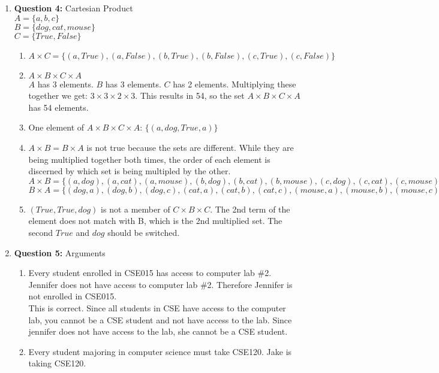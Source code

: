 \documentclass[11pt]{article}
\begin{document}
\begin{enumerate}
\begin{enumerate}[label=(\alph*)]
\end{enumerate}
\item 
\textbf{Question 4:} Cartesian Product \\
$A = \{a,b,c\}$ \\
$B = \{dog,cat,mouse\} $ \\
$C = \{True, False\} $ 
\begin{enumerate}[label=(\alph*)]
    \item
    $A \times  C = \{(a, True), (a, False), (b, True), (b, False), (c, True), (c, False)\}$
    \item 
    $A \times B \times C \times A$ \\
    $A$ has 3 elements. $B$ has 3 elements. $C$ has 2 elements. Multiplying these together we get: $3 \times 3 \times 2 \times 3$. This results in 54, so the set $A \times B \times C \times A$ has 54 elements. 
    \item
    One element of $A \times B \times C \times A$: $\{(a,dog,True,a)\}$
    \item
    $A \times B = B \times A$ is not true because the sets are different. While they are being multiplied together both times, the order of each element is discerned by which set is being multipled by the other. \\
    $A \times B = \{(a, dog), (a, cat), (a, mouse), (b, dog), (b, cat), (b, mouse), (c, dog), (c, cat), (c, mouse)\}$ \\
    $B \times A = \{(dog, a), (dog, b), (dog, c), (cat, a), (cat, b), (cat, c), (mouse, a), (mouse, b), (mouse, c)\}$
    \item 
    $(True, True, dog)$ is not a member of $C \times B \times C$. The 2nd term of the element does not match with B, which is the 2nd multiplied set. The second $True$ and $dog$ should be switched.
\end{enumerate}
\item
\textbf{Question 5:} Arguments 
\begin{enumerate}[label=(\alph*)]
    \item
    Every student enrolled in CSE015 has access to computer lab \#2. Jennifer does not have access to computer lab \#2. Therefore Jennifer is not enrolled in CSE015. \\
    This is correct. Since all students in CSE have access to the computer lab, you cannot be a CSE student and not have access to the lab. Since jennifer does not have access to the lab, she cannot be a CSE student. 
    \item Every student majoring in computer science must take CSE120. Jake is taking CSE120.

\end{enumerate}
\end{enumerate}
\end{document}
